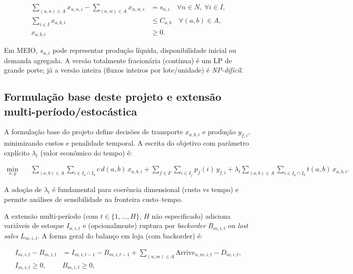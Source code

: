 \begin{align}
\sum_{(u,n)\in A} x_{u,n,i} - \sum_{(n,w)\in A} x_{n,w,i} &= s_{n,i} \quad \forall n\in N,\ \forall i\in I, \label{eq:mcf_balance} \\
\sum_{i\in I} x_{a,b,i} &\le C_{a,b} \quad \forall (a,b)\in A, \label{eq:mcf_capacity}\\
x_{a,b,i} &\ge 0.
\end{align}

Em MEIO, \(s_{n,i}\) pode representar produção líquida, disponibilidade inicial ou demanda agregada. \cite{Shapiro2001ModelingSupplyChain} A versão totalmente fracionária (contínua) é um LP de grande porte; já a versão inteira (fluxos inteiros por lote/unidade) é \emph{NP-difícil}. \cite{AhujaMagnantiOrlin1993NetworkFlows}

\subsection{Formulação base deste projeto e extensão multi-período/estocástica}

A formulação base do projeto define decisões de transporte \(x_{a,b,i}\) e produção \(y_{f,i}\), minimizando custos e penalidade temporal. A escrita do objetivo com parâmetro explícito \(\lambda_t\) (valor econômico do tempo) é:

\begin{align}
\min_{x,y} \quad
& \sum_{(a,b)\in A} \sum_{i \in I_a \cap I_b} c \, d(a,b)\, x_{a,b,i}
+ \sum_{f\in F}\sum_{i\in I_f} p_f(i)\, y_{f,i}
+ \lambda_t \sum_{(a,b)\in A} \sum_{i \in I_a \cap I_b} t(a,b)\, x_{a,b,i}.
\label{eq:obj_cost_time_chap_tec}
\end{align}

A adoção de \(\lambda_t\) é fundamental para coerência dimensional (custo vs tempo) e permite análises de sensibilidade na fronteira custo--tempo. \cite{SimchiLevi2009CadeiaSuprimentos,Chopra2022SCM}

A extensão multi-período (com \(t\in\{1,\dots,H\}\), \(H\) não especificado) adiciona variáveis de estoque \(I_{n,i,t}\) e (opcionalmente) ruptura por \emph{backorder} \(B_{m,i,t}\) ou \emph{lost sales} \(L_{m,i,t}\). A forma geral do balanço em loja (com backorder) é:

\begin{align}
I_{m,i,t} - B_{m,i,t} &= I_{m,i,t-1} - B_{m,i,t-1} + \sum_{(u,m)\in A} \text{Arrive}_{u,m,i,t} - D_{m,i,t}, \\
I_{m,i,t} \ge 0,\ \ & B_{m,i,t}\ge 0,
\end{align}

